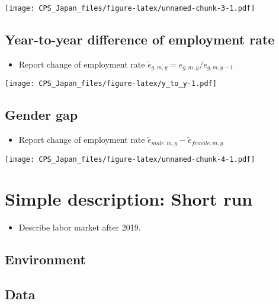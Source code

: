 \documentclass[
]{book}
\providecommand{\tightlist}{%
  \setlength{\itemsep}{0pt}\setlength{\parskip}{0pt}}
\begin{document}
\texttt{[image: CPS\_Japan\_files/figure-latex/unnamed-chunk-3-1.pdf]}

\hypertarget{year-to-year-difference-of-employment-rate}{%
\section{Year-to-year difference of employment rate}\label{year-to-year-difference-of-employment-rate}}

\begin{itemize}
\tightlist
\item
  Report change of employment rate \(\tilde e_{g,m,y}=e_{g,m,y}/e_{g,m,y-1}\)
\end{itemize}

\texttt{[image: CPS\_Japan\_files/figure-latex/y\_to\_y-1.pdf]}

\hypertarget{gender-gap}{%
\section{Gender gap}\label{gender-gap}}

\begin{itemize}
\tightlist
\item
  Report change of employment rate \(\tilde e_{male,m,y} - \tilde e_{female,m,y}\)
\end{itemize}

\texttt{[image: CPS\_Japan\_files/figure-latex/unnamed-chunk-4-1.pdf]}

\hypertarget{simple-description-short-run}{%
\chapter{Simple description: Short run}\label{simple-description-short-run}}

\begin{itemize}
\tightlist
\item
  Describe labor market after 2019.
\end{itemize}

\hypertarget{environment-1}{%
\section{Environment}\label{environment-1}}

\hypertarget{data-1}{%
\section{Data}\label{data-1}}
\end{document}
